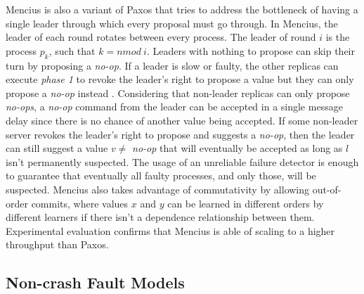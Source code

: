 \documentclass[runningheads,a4paper]{llncs}
\begin{document}
Mencius is also a variant of Paxos that tries to address the bottleneck of having a single leader through which every proposal must go through. In Mencius, the leader of each round rotates between every process. The leader of round $i$ is the process $p_k$, such that $k = n mod\ i$.  Leaders with nothing to propose can skip their turn by proposing a \textit{no-op}. If a leader is slow or faulty, the other replicas can execute \textit{phase 1} to revoke the leader's right to propose a value but they can only propose a \textit{no-op} instead \cite{Mao2008}. Considering that non-leader replicas can only propose \textit{no-ops}, a \textit{no-op} command from the leader can be accepted in a single message delay since there is no chance of another value being accepted. If some non-leader server revokes the leader's right to propose and suggests a \textit{no-op}, then the leader can still suggest a value $v \neq$ \textit{no-op} that will eventually be accepted as long as $l$ isn't permanently suspected. The usage of an unreliable failure detector is enough to guarantee that eventually all faulty processes, and only those, will be suspected. Mencius also takes advantage of commutativity by allowing out-of-order commits, where values $x$ and $y$ can be learned in different orders by different learners if there isn't a dependence relationship between them. Experimental evaluation confirms that Mencius is able of scaling to a higher throughput than Paxos. 

\subsection{Non-crash Fault Models} \label{Non-Crash}
\end{document}
